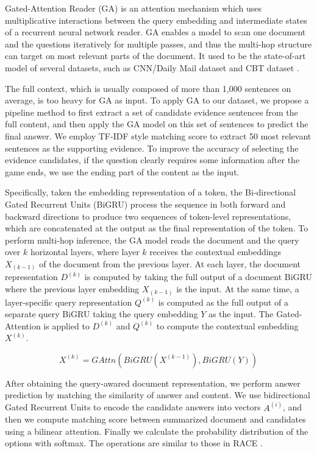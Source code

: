 Gated-Attention Reader (GA) is an attention mechanism which uses multiplicative interactions between the query embedding and intermediate states of a recurrent neural network reader. GA enables a model to scan one document and the questions iteratively for multiple passes, and thus the multi-hop structure can target on most relevant parts of the document. It used to be the state-of-art model of several datasets, such as CNN/Daily Mail dataset \cite{Hermann2015Teaching} and CBT dataset \cite{hill2015goldilocks}. 

The full context, which is usually composed of more than 1,000 sentences on average, is too heavy for GA as input. To apply GA to our dataset, we propose a pipeline method to first extract %
a set of candidate evidence sentences from the full content, and then apply the GA model on this set of sentences to predict the final answer. We employ TF-IDF style matching score to extract 50 most relevant sentences as the supporting evidence. %
To improve the accuracy of selecting the evidence candidates, if the question clearly requires some information after the game ends, we use the ending part of the content as the input.

Specifically, taken the embedding representation of a token, the Bi-directional Gated Recurrent Units (BiGRU) process the sequence in both forward and backward directions to produce two sequences of token-level representations, which are concatenated at the output as the final representation of the token. 
To perform multi-hop inference, the GA model reads the document and the query over $k$ horizontal layers, where layer $k$ receives the contextual embeddings $X_{(k-1)}$ of the document from the previous layer. 
At each layer, the document representation $D^{(k)}$ is computed by taking the full output of a document BiGRU where the previous layer embedding $X_{(k-1)}$ is the input. At the same time, a layer-specific query representation $Q^{(k)}$ is computed as the full output of a separate query BiGRU taking the query embedding $Y$ as the input. The Gated-Attention is applied to $D^{(k)}$ and $Q^{(k)}$ to compute the contextual embedding $X^{(k)}$.

\begin{equation}
    X^{(k)} = GAttn(BiGRU(X^{(k-1)}), BiGRU(Y))
\end{equation}

After obtaining the query-awared document representation, we perform answer prediction by matching the similarity of answer and content. We use bidirectional Gated Recurrent Units to encode the candidate answers into vectors $A^(i)$, and then we compute matching score between summarized document and candidates using a bilinear attention.
Finally we calculate the probability distribution of the options with softmax. The operations are similar to those in RACE \cite{lai2017race}.

